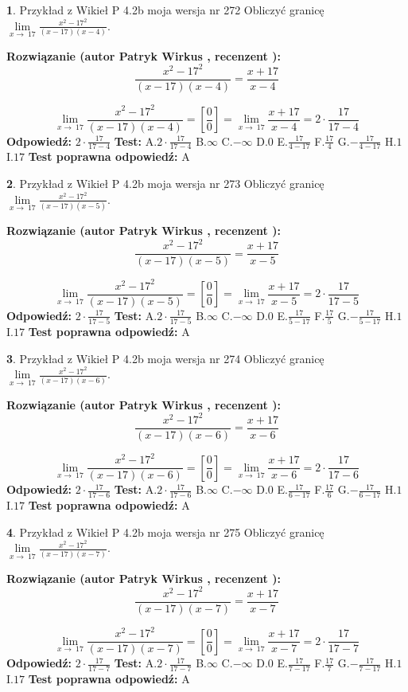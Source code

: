 \documentclass[12pt, a4paper]{article}
\theoremstyle{definition} %
\newtheorem{zad}{}
\newcommand{\zadStart}[1]{\begin{zad}#1\newline}
\newcommand{\zadStop}{\end{zad}}
\newcommand{\rozwStart}[2]{\noindent \textbf{Rozwiązanie (autor #1 , recenzent #2): }\newline}
\newcommand{\rozwStop}{\newline}
\newcommand{\odpStart}{\noindent \textbf{Odpowiedź:}\newline}
\newcommand{\odpStop}{\newline}
\newcommand{\testStart}{\noindent \textbf{Test:}\newline}
\newcommand{\testStop}{\newline}
\newcommand{\kluczStart}{\noindent \textbf{Test poprawna odpowiedź:}\newline}
\newcommand{\kluczStop}{\newline}
\begin{document}
\zadStart{Przykład z Wikieł P 4.2b moja wersja nr 272}
Obliczyć granicę $\lim\limits_{x\to\ 17}\frac{x^{2}-17^{2}}{(x-17)(x-4)}$.
\zadStop
\rozwStart{Patryk Wirkus}{}
$$\frac{x^{2}-17^{2}}{(x-17)(x-4)}=\frac{x+17}{x-4}$$

$$\lim\limits_{x\to\ 17}\frac{x^{2}-17^{2}}{(x-17)(x-4)}=[\frac{0}{0}]=\lim\limits_{x\to\ 17}\frac{x+17}{x-4}=2 \cdot \frac{17}{17-4}$$
\rozwStop
\odpStart
$2 \cdot \frac{17}{17-4}$
\odpStop
\testStart
A.$2 \cdot \frac{17}{17-4}$
B.$\infty$
C.$-\infty$
D.$0$
E.$\frac{17}{4-17}$
F.$\frac{17}{4}$
G.$-\frac{17}{4-17}$
H.$1$
I.$17$
\testStop
\kluczStart
A
\kluczStop



\zadStart{Przykład z Wikieł P 4.2b moja wersja nr 273}
Obliczyć granicę $\lim\limits_{x\to\ 17}\frac{x^{2}-17^{2}}{(x-17)(x-5)}$.
\zadStop
\rozwStart{Patryk Wirkus}{}
$$\frac{x^{2}-17^{2}}{(x-17)(x-5)}=\frac{x+17}{x-5}$$

$$\lim\limits_{x\to\ 17}\frac{x^{2}-17^{2}}{(x-17)(x-5)}=[\frac{0}{0}]=\lim\limits_{x\to\ 17}\frac{x+17}{x-5}=2 \cdot \frac{17}{17-5}$$
\rozwStop
\odpStart
$2 \cdot \frac{17}{17-5}$
\odpStop
\testStart
A.$2 \cdot \frac{17}{17-5}$
B.$\infty$
C.$-\infty$
D.$0$
E.$\frac{17}{5-17}$
F.$\frac{17}{5}$
G.$-\frac{17}{5-17}$
H.$1$
I.$17$
\testStop
\kluczStart
A
\kluczStop



\zadStart{Przykład z Wikieł P 4.2b moja wersja nr 274}
Obliczyć granicę $\lim\limits_{x\to\ 17}\frac{x^{2}-17^{2}}{(x-17)(x-6)}$.
\zadStop
\rozwStart{Patryk Wirkus}{}
$$\frac{x^{2}-17^{2}}{(x-17)(x-6)}=\frac{x+17}{x-6}$$

$$\lim\limits_{x\to\ 17}\frac{x^{2}-17^{2}}{(x-17)(x-6)}=[\frac{0}{0}]=\lim\limits_{x\to\ 17}\frac{x+17}{x-6}=2 \cdot \frac{17}{17-6}$$
\rozwStop
\odpStart
$2 \cdot \frac{17}{17-6}$
\odpStop
\testStart
A.$2 \cdot \frac{17}{17-6}$
B.$\infty$
C.$-\infty$
D.$0$
E.$\frac{17}{6-17}$
F.$\frac{17}{6}$
G.$-\frac{17}{6-17}$
H.$1$
I.$17$
\testStop
\kluczStart
A
\kluczStop



\zadStart{Przykład z Wikieł P 4.2b moja wersja nr 275}
Obliczyć granicę $\lim\limits_{x\to\ 17}\frac{x^{2}-17^{2}}{(x-17)(x-7)}$.
\zadStop
\rozwStart{Patryk Wirkus}{}
$$\frac{x^{2}-17^{2}}{(x-17)(x-7)}=\frac{x+17}{x-7}$$

$$\lim\limits_{x\to\ 17}\frac{x^{2}-17^{2}}{(x-17)(x-7)}=[\frac{0}{0}]=\lim\limits_{x\to\ 17}\frac{x+17}{x-7}=2 \cdot \frac{17}{17-7}$$
\rozwStop
\odpStart
$2 \cdot \frac{17}{17-7}$
\odpStop
\testStart
A.$2 \cdot \frac{17}{17-7}$
B.$\infty$
C.$-\infty$
D.$0$
E.$\frac{17}{7-17}$
F.$\frac{17}{7}$
G.$-\frac{17}{7-17}$
H.$1$
I.$17$
\testStop
\kluczStart
A
\kluczStop
\end{document}
